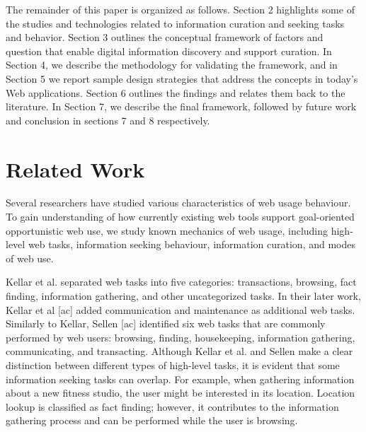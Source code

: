 \documentclass{casconpaper}
\begin{document}
{The remainder of this paper is organized as follows. Section 2 highlights some of the studies and technologies related to information curation and seeking tasks and behavior. Section 3 outlines the conceptual framework of factors and question that enable digital information discovery and support curation. In Section 4, we describe the methodology for validating the framework, and in Section 5 we  report sample design strategies that address the concepts in today's Web applications. Section 6 outlines the findings and relates them back to the literature. In Section 7, we describe the final framework, followed by future work and conclusion in sections 7 and 8 respectively.

} %


{\section{Related Work}

Several researchers have studied various characteristics of web usage behaviour. To gain understanding of how currently existing web tools support goal-oriented opportunistic web use, we study known mechanics of web usage, including high-level web tasks, information seeking behaviour, information curation, and modes of web use. 

Kellar et al. \cite{kellar2006} separated web tasks into five categories: transactions, browsing, fact finding, information gathering, and other uncategorized tasks.  In their later work, Kellar et al [ac] added communication and maintenance as additional web tasks. Similarly to Kellar, Sellen [ac] identified six web tasks that are commonly performed by web users: browsing, finding, housekeeping, information gathering, communicating, and transacting. Although Kellar et al. and Sellen make a clear distinction between different types of high-level tasks, it is evident that some information seeking tasks can overlap. For example, when gathering information about a new fitness studio, the user might be interested in its location. Location lookup is classified as fact finding; however, it contributes to the information gathering process and can be performed while the user is browsing.

}
\end{document}
